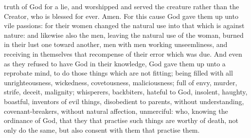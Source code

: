 truth of God for a lie, and worshipped and served the creature rather than the Creator, who is blessed for ever. Amen.  For this cause God gave them up unto vile passions: for their women changed the natural use into that which is against nature: and likewise also the men, leaving the natural use of the woman, burned in their lust one toward another, men with men working unseemliness, and receiving in themselves that recompense of their error which was due.  And even as they refused to have God in their knowledge, God gave them up unto a reprobate mind, to do those things which are not fitting; being filled with all unrighteousness, wickedness, covetousness, maliciousness; full of envy, murder, strife, deceit, malignity; whisperers, backbiters, hateful to God, insolent, haughty, boastful, inventors of evil things, disobedient to parents, without understanding, covenant-breakers, without natural affection, unmerciful: who, knowing the ordinance of God, that they that practise such things are worthy of death, not only do the same, but also consent with them that practise them. 

